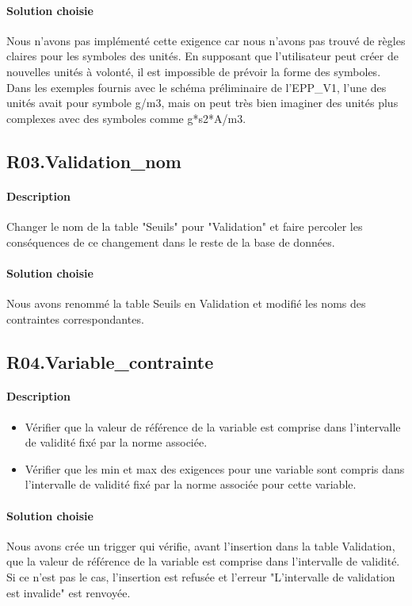 \documentclass{article}
\begin{document}
\paragraph{Solution choisie}
Nous n'avons pas implémenté cette exigence car nous n'avons pas trouvé de règles
claires pour les symboles des unités. En supposant que l'utilisateur 
peut créer de nouvelles unités à volonté, il est impossible de prévoir la forme des symboles.
Dans les exemples fournis avec le schéma préliminaire de l'EPP\_V1, l'une des unités
avait pour symbole \textmugreek g/m3, mais on peut très bien imaginer des unités plus complexes avec
des symboles comme \textmugreek g*s2*A/m3.

\subsection{R03.Validation\_nom}
\paragraph{Description} Changer le nom de la table "Seuils" pour "Validation"
et faire percoler les conséquences de ce changement dans le reste de la base de données.

\paragraph{Solution choisie}
Nous avons renommé la table Seuils en Validation et modifié les noms des contraintes
correspondantes.

\subsection{R04.Variable\_contrainte}
\paragraph{Description} 
\begin{itemize}
    \item Vérifier que la valeur de référence de la variable est comprise dans l'intervalle de
    validité fixé par la norme associée.
    \item Vérifier que les min et max des exigences pour une variable sont compris
    dans l'intervalle de validité fixé par la norme associée pour cette variable.
\end{itemize}

\paragraph{Solution choisie}
Nous avons crée un trigger qui vérifie, avant l'insertion dans la table Validation,
que la valeur de référence de la variable est comprise dans l'intervalle de validité.
Si ce n'est pas le cas, l'insertion est refusée et l'erreur "L'intervalle de validation est invalide"
est renvoyée.
\end{document}

